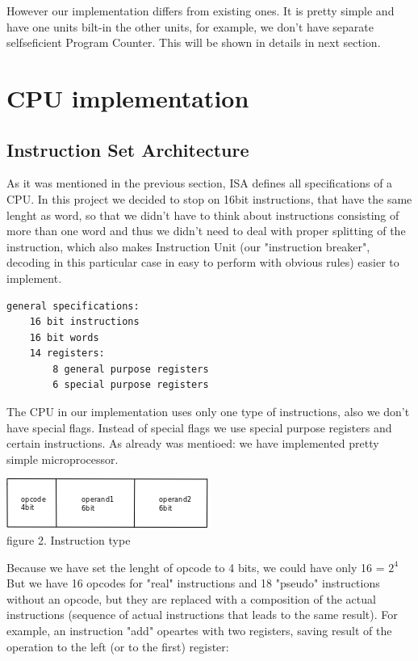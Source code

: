 \documentclass[11pt,a4paper]{article}
\begin{document}
However our implementation differs from existing ones. It is pretty simple and have one units bilt-in the other units, for example, we don't have separate selfseficient Program Counter. This will be shown in details in next section.\\ 

\newpage
\section{CPU implementation}
\subsection{Instruction Set Architecture}
As it was mentioned in the previous section, ISA defines all specifications of a CPU. In this project we decided to stop on 16bit instructions, that have the same lenght as word, so that we didn't have to think about instructions consisting of more than one word and thus we didn't need to deal with proper splitting of the instruction, which also makes Instruction Unit (our "instruction breaker", decoding in this particular case in easy to perform with obvious rules) easier to implement.
\begin{verbatim}
general specifications:
	16 bit instructions
	16 bit words
	14 registers:
		8 general purpose registers
		6 special purpose registers
\end{verbatim}
The CPU in our implementation uses only one type of instructions, also we don't have special flags. Instead of special flags we use special purpose registers and certain instructions. As already was mentioed: we have implemented pretty simple microprocessor.
\begin{center}
\includegraphics[scale=0.7]{pics/instruction1.png}\\
figure 2. Instruction type
\end{center}
Because we have set the lenght of opcode to 4 bits, we could have only 16 = $2^{4}$ But we have 16 opcodes for "real" instructions and 18 "pseudo" instructions without an opcode, but they are replaced with a composition of the actual instructions (sequence of actual instructions that leads to the same result). For example, an instruction "add" opeartes with two registers, saving result of the operation to the left (or to the first) register:
\end{document}
